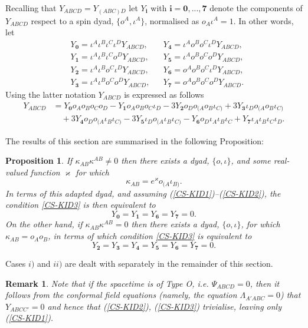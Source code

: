 \documentclass[10pt,a4paper]{article}
\theoremstyle{plain}
\newtheorem{proposition}{Proposition}
\newtheorem{remark}{Remark}
\def\bmi{{\bm i}}
\begin{document}
Recalling that $Y_{ABCD}=Y_{(ABC)D}$ let $Y_{\bmi}$ with $\bmi=\bm0,...,\bm7$
 denote the components of $Y_{ABCD}$ respect to a spin dyad, $\lbrace o^{A},
\iota^{A}\rbrace$, normalised as $o_{A}\iota^{A}=1$.
In other words, let
\begin{align*}
& Y_{\bm0} =\iota^A\iota^B\iota^C\iota^D Y_{ABCD} , && Y_{\bm4} =
  \iota^A o^B o^C\iota^D Y_{ABCD},\\ & Y_{\bm1} =\iota^A\iota^B\iota^C
  o^D Y_{ABCD} , && Y_{\bm5} =\iota^A o^B o^C o^D Y_{ABCD} ,\\ &
  Y_{\bm2} =\iota^A\iota^B o^C\iota^D Y_{ABCD} , && Y_{\bm6} =o^A o^B
  o^C\iota^D Y_{ABCD} ,\\ & Y_{\bm3} =\iota^A\iota^B o^C o^D Y_{ABCD}
  , && Y_{\bm7} = o^A o^B o^C o^D Y_{ABCD}.
\end{align*}
Using the latter notation $Y_{ABCD}$ is expressed as follows
\begin{align}\label{CottonAdaptedDyad}
Y_{ABCD} &= Y_{\bm0} o_{A} o_{B} o_{C} o_{D} - Y_{\bm1} o_{A} o_{B}
o_{C} \iota_{D} - 3 Y_{\bm2} o_{D} o_{(A}o_{B}\iota_{C)}+ 3 Y_{\bm3}
\iota_{D} o_{(A}o_{B}\iota_{C)} \nonumber \\ & \quad + 3 Y_{\bm4}
o_{D} o_{(A}\iota_{B}\iota_{C)} - 3 Y_{\bm5} \iota_{D}
o_{(A}\iota_{B}\iota_{C)}- Y_{\bm6} o_{D} \iota_{A} \iota_{B}
\iota_{C}+ Y_{\bm7} \iota_{A} \iota_{B} \iota_{C} \iota_{D}.
\end{align}

The results of this section are summarised in the following Proposition:

\begin{proposition}\label{PropositionRestrictionOnCotton}
If $\kappa_{AB}\kappa^{AB}\neq 0$ then there exists a dyad, $\lbrace
o,\iota\rbrace$, and some real-valued function $\varkappa$ for which
\[\kappa_{AB}=e^\varkappa o_{(A}\iota_{B)}.\]
In terms of this adapted dyad, and assuming
(\ref{CS-KID1})--(\ref{CS-KID2}), the condition \eqref{CS-KID3} is
then equivalent to
\[Y_{\bm0}=Y_{\bm1}=Y_{\bm6}=Y_{\bm7}=0.\]
On the other hand, if $\kappa_{AB}\kappa^{AB}= 0$ then
 there exists a dyad, $\lbrace o,\iota\rbrace$, for 
which $\kappa_{AB}=o_Ao_B$, in terms of which condition 
\eqref{CS-KID3} is equivalent to 
\[
Y_{\bm2}=Y_{\bm3}=Y_{\bm4}=Y_{\bm5}=Y_{\bm6}=Y_{\bm7}=0.
\]
\end{proposition}
Cases $i)$ and $ii)$ are dealt with separately in the remainder of
this section.
\begin{remark}
\emph{Note that if the spacetime is of Type O, i.e. $\Psi_{ABCD}=0 $,
  then it follows from the conformal field equations (namely, the
  equation $\Lambda_{A'ABC}=0$) that $Y_{ABCC'}=0$ and hence that
  (\ref{CS-KID2}), (\ref{CS-KID3}) trivialise, leaving only
  (\ref{CS-KID1}).}
\end{remark}
\end{document}
